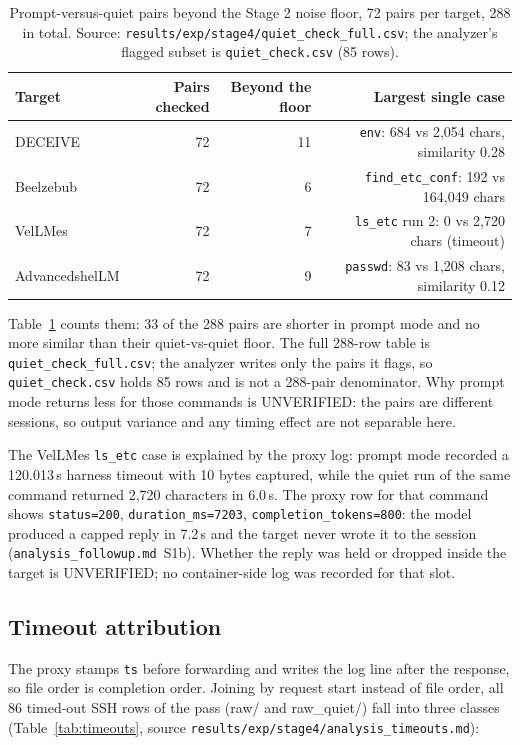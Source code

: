 \documentclass[a4paper,11pt]{article}
\begin{document}
\begin{table}[ht]
\centering
\caption{Prompt-versus-quiet pairs beyond the Stage 2 noise floor, 72 pairs per
target, 288 in total. Source:
\texttt{results/exp/stage4/quiet\_check\_full.csv}; the analyzer's flagged
subset is \texttt{quiet\_check.csv} (85 rows).}
\label{tab:quiet}
\scriptsize
\begin{tabular}{l r r r}
\toprule
Target & Pairs checked & Beyond the floor & Largest single case \\
\midrule
DECEIVE        & 72 & 11 & \texttt{env}: 684 vs 2,054 chars, similarity 0.28 \\
Beelzebub      & 72 & 6  & \texttt{find\_etc\_conf}: 192 vs 164,049 chars \\
VelLMes        & 72 & 7  & \texttt{ls\_etc} run 2: 0 vs 2,720 chars (timeout) \\
AdvancedshelLM & 72 & 9  & \texttt{passwd}: 83 vs 1,208 chars, similarity 0.12 \\
\bottomrule
\end{tabular}
\end{table}

Table~\ref{tab:quiet} counts them: 33 of the 288 pairs are shorter in prompt
mode and no more similar than their quiet-vs-quiet floor. The full 288-row
table is \texttt{quiet\_check\_full.csv}; the analyzer writes only the pairs it
flags, so \texttt{quiet\_check.csv} holds 85 rows and is not a 288-pair
denominator. Why prompt mode returns less for those commands is UNVERIFIED: the
pairs are different sessions, so output variance and any timing effect are not
separable here.

The VelLMes \texttt{ls\_etc} case is explained by the proxy log: prompt mode
recorded a 120.013\,s harness timeout with 10 bytes captured, while the quiet
run of the same command returned 2,720 characters in 6.0\,s. The proxy row for
that command shows \texttt{status=200}, \texttt{duration\_ms=7203},
\texttt{completion\_tokens=800}: the model produced a capped reply in 7.2\,s and
the target never wrote it to the session
(\texttt{analysis\_followup.md}~S1b). Whether the reply was held or dropped
inside the target is UNVERIFIED; no container-side log was recorded for that
slot.

\subsection{Timeout attribution}
\label{sec:timeouts}

The proxy stamps \texttt{ts} before forwarding and writes the log line after
the response, so file order is completion order. Joining by request start
instead of file order, all 86 timed-out SSH rows of the pass (raw/ and
raw\_quiet/) fall into three classes (Table~\ref{tab:timeouts},
source \texttt{results/exp/stage4/analysis\_timeouts.md}):
\end{document}
